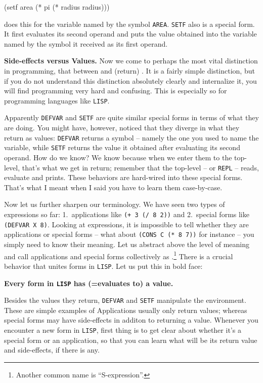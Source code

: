 \documentclass[a4paper,11pt]{article}
\begin{document}
\begin{uenum}
\begin{lispcode}
(setf area (* pi (* radius radius)))
\end{lispcode}

does this for the variable named by the symbol \Verb+AREA+. \Verb+SETF+ also is a special form. It first evaluates its second operand and puts the value obtained into the variable named by the symbol it received as its first operand.  

\item {\bf Side-effects versus Values.} Now we come to perhaps the most vital distinction in programming, that between  and (return) . It is a fairly simple distinction, but if you do not understand this distinction absolutely clearly and internalize it, you will find programming very hard and confusing. This is especially so for programming languages like \Verb+LISP+.

Apparently \Verb+DEFVAR+ and \Verb+SETF+ are quite similar special forms in terms of what they are doing. You might have, however, noticed that they diverge in what they return as values: \Verb+DEFVAR+ returns a symbol -- namely the one you used to name the variable, while \Verb+SETF+ returns the value it obtained after evaluating its second operand. How do we know? We know because when we enter them to the top-level, that's what we get in return; remember that the top-level -- or \Verb+REPL+ -- reads, evaluate and prints. These behaviors are hard-wired into these special forms. That's what I meant when I said you have to learn them case-by-case.

Now let us further sharpen our terminology. We have seen two types of expressions so far: 1.\ applications like \Verb=(+ 3 (/ 8 2))= and 2.\ special forms like \Verb+(DEFVAR X 8)+. Looking at expressions, it is impossible to tell whether they are applications or special forms -- what about \Verb+(CONS C (* 8 7))+ for instance -- you simply need to know their meaning. Let us abstract above the level of meaning and call applications and special forms collectively as .\footnote{Another common name is ``S-expression''.} There is a crucial behavior that unites forms in \Verb+LISP+. Let us put this in bold face:

{\bf Every form in \Verb+LISP+ has (=evaluates to) a value.}

Besides the values they return, \Verb+DEFVAR+ and \Verb+SETF+ manipulate the environment. These are simple examples of  Applications usually only return values; whereas special forms may have side-effects in additon to returning a value. Whenever you encounter a new form in \Verb+LISP+, first thing is to get clear about whether it's a special form or an application, so that you can learn what will be its return value and side-effects, if there is any.


\end{uenum}
\end{document}
